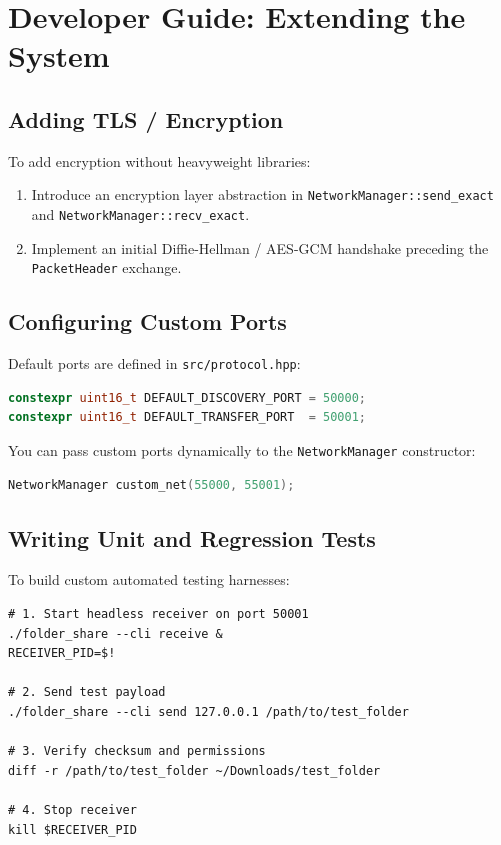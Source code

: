 \documentclass[11pt,a4paper]{article}
\begin{document}
\section{Developer Guide: Extending the System}

\subsection{Adding TLS / Encryption}
To add encryption without heavyweight libraries:
\begin{enumerate}
    \item Introduce an encryption layer abstraction in \texttt{NetworkManager::send\_exact} and \texttt{NetworkManager::recv\_exact}.
    \item Implement an initial Diffie-Hellman / AES-GCM handshake preceding the \texttt{PacketHeader} exchange.
\end{enumerate}

\subsection{Configuring Custom Ports}
Default ports are defined in \texttt{src/protocol.hpp}:
\begin{lstlisting}[language=C++]
constexpr uint16_t DEFAULT_DISCOVERY_PORT = 50000;
constexpr uint16_t DEFAULT_TRANSFER_PORT  = 50001;
\end{lstlisting}
You can pass custom ports dynamically to the \texttt{NetworkManager} constructor:
\begin{lstlisting}[language=C++]
NetworkManager custom_net(55000, 55001);
\end{lstlisting}

\subsection{Writing Unit and Regression Tests}
To build custom automated testing harnesses:
\begin{lstlisting}[style=bashblock]
# 1. Start headless receiver on port 50001
./folder_share --cli receive &
RECEIVER_PID=$!

# 2. Send test payload
./folder_share --cli send 127.0.0.1 /path/to/test_folder

# 3. Verify checksum and permissions
diff -r /path/to/test_folder ~/Downloads/test_folder

# 4. Stop receiver
kill $RECEIVER_PID
\end{lstlisting}
\end{document}
